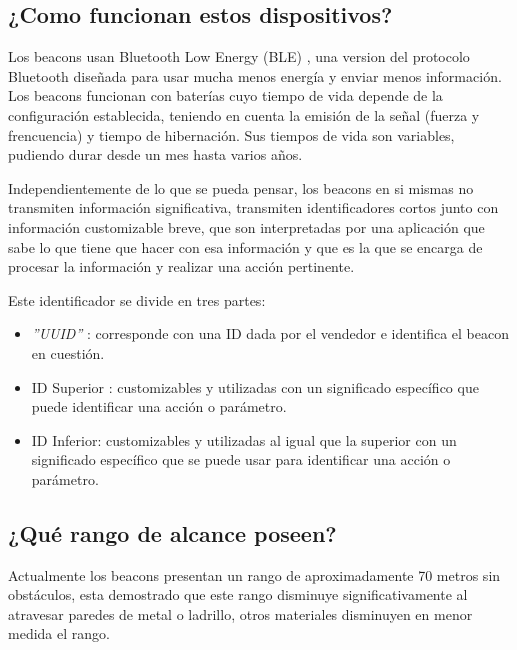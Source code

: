\subsection{¿Como funcionan estos dispositivos?}

Los beacons usan Bluetooth Low Energy (BLE) \cite{URL::BluetoothLowEnergy}, una version del protocolo Bluetooth diseñada para usar mucha menos energía y enviar menos información. Los beacons funcionan con baterías cuyo tiempo de vida depende de la configuración establecida, teniendo en cuenta la emisión de la señal (fuerza y frencuencia) y tiempo de hibernación. Sus tiempos de vida son variables, pudiendo durar desde un mes hasta varios años. 




Independientemente de lo que se pueda pensar, los beacons en si mismas no transmiten información significativa, transmiten identificadores cortos junto con información customizable breve, que son interpretadas por una aplicación que sabe lo que tiene que hacer con esa información y que es la que se encarga de procesar la información y realizar una acción pertinente.

Este identificador se divide en tres partes: 

\begin{itemize}
\item \textit{''UUID''} \cite{URL::UUID} : corresponde con una ID dada por el vendedor e identifica el beacon en cuestión.
\item ID Superior : customizables y utilizadas con un significado específico que puede identificar una acción o parámetro. 
\item ID Inferior: customizables y utilizadas al igual que la superior con un significado específico que se puede usar para identificar una acción o parámetro.
\end{itemize}


\subsection{¿Qué rango de alcance poseen?}

Actualmente los beacons presentan un rango de aproximadamente 70 metros sin obstáculos, esta demostrado que este rango disminuye significativamente al atravesar paredes de metal o ladrillo, otros materiales disminuyen en menor medida el rango. 

